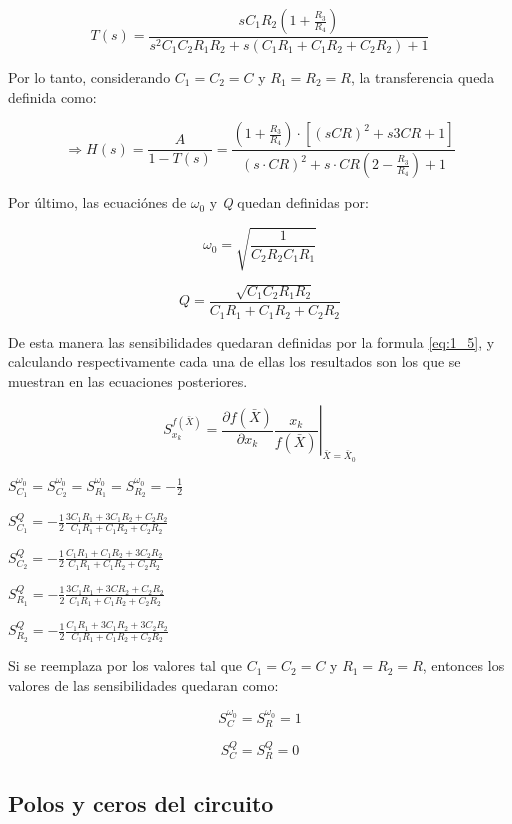\[
T(s)=\frac{sC_{1}R_{2}\left(1+\frac{R_{3}}{R_{4}}\right)}{s^{2}C_{1}C_{2}R_{1}R_{2}+s\left(C_{1}R_{1}+C_{1}R_{2}+C_{2}R_{2}\right)+1}
\]

Por lo tanto, considerando $C_{1}=C_{2}=C$ y $R_{1}=R_{2}=R$, la
transferencia queda definida como:

\[
\Rightarrow H(s)=\frac{A}{1-T(s)}=\frac{(1+\frac{R_{3}}{R_{4}})\cdot[(sCR)^{2}+s3CR+1]}{(s\cdot CR)^{2}+s\cdot CR(2-\frac{R_{3}}{R_{4}})+1}
\]

Por último, las ecuaciónes de $\omega_{0}$ y \emph{Q }quedan definidas
por:

\begin{equation}
\omega_{0}=\sqrt{\frac{1}{C_{2}R_{2}C_{1}R_{1}}}\label{eq:1_6}
\end{equation}

\[
Q=\frac{\sqrt{C_{1}C_{2}R_{1}R_{2}}}{C_{1}R_{1}+C_{1}R_{2}+C_{2}R_{2}}
\]

De esta manera las sensibilidades quedaran definidas por la formula
\ref{eq:1_5}, y calculando respectivamente cada una de ellas los
resultados son los que se muestran en las ecuaciones posteriores.

\begin{equation}
S_{x_{k}}^{f(\bar{X})}=\left.\frac{\partial f(\bar{X})}{\partial x_{k}}\frac{x_{k}}{f(\bar{X})}\right|_{\bar{X}=\bar{X}_{0}}\label{eq:1_5}
\end{equation}

$S_{C_{1}}^{\omega_{0}}=S_{C_{2}}^{\omega_{0}}=S_{R_{1}}^{\omega_{0}}=S_{R_{2}}^{\omega_{0}}=-\frac{1}{2}$

$S_{C_{1}}^{Q}=-\frac{1}{2}\frac{3C_{1}R_{1}+3C_{1}R_{2}+C_{2}R_{2}}{C_{1}R_{1}+C_{1}R_{2}+C_{2}R_{2}}$

$S_{C_{2}}^{Q}=-\frac{1}{2}\frac{C_{1}R_{1}+C_{1}R_{2}+3C_{2}R_{2}}{C_{1}R_{1}+C_{1}R_{2}+C_{2}R_{2}}$

$S_{R_{1}}^{Q}=-\frac{1}{2}\frac{3C_{1}R_{1}+3CR_{2}+C_{2}R_{2}}{C_{1}R_{1}+C_{1}R_{2}+C_{2}R_{2}}$

$S_{R_{2}}^{Q}=-\frac{1}{2}\frac{C_{1}R_{1}+3C_{1}R_{2}+3C_{2}R_{2}}{C_{1}R_{1}+C_{1}R_{2}+C_{2}R_{2}}$

Si se reemplaza por los valores tal que $C_{1}=C_{2}=C$ y $R_{1}=R_{2}=R$,
entonces los valores de las sensibilidades quedaran como:

\[
S_{C}^{\omega_{0}}=S_{R}^{\omega_{0}}=1
\]

\[
S_{C}^{Q}=S_{R}^{Q}=0
\]

\subsection{Polos y ceros del circuito}

